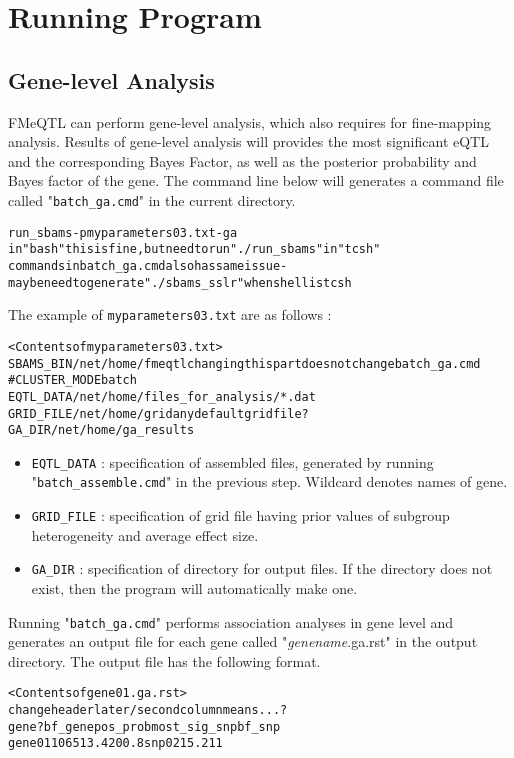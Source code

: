 \documentclass[11pt,fleqn]{article}
\begin{document}
\section{Running Program}
\subsection{Gene-level Analysis}
 FMeQTL can perform gene-level analysis, which also requires for fine-mapping analysis. Results of gene-level analysis will provides the most significant eQTL and the corresponding Bayes Factor, as well as the posterior probability and Bayes factor of the gene. 
 The command line below will generates a command file called "{\tt batch\_ga.cmd}" in the current directory.
 \begin{alltt}
 run_sbams -p myparameters03.txt -ga
 {\color{red} in "bash" this is fine, but need to run "./run_sbams" in "tcsh"}
 {\color{red} commands in batch_ga.cmd also has same issue - maybe need to generate "./sbams_sslr" when shell is tcsh}
 \end{alltt}
 The example of {\tt myparameters03.txt} are as follows :
  \begin{alltt}
 <Contents of  myparameters03.txt>
 SBAMS_BIN /net/home/fmeqtl {\color{red} changing this part does not change batch_ga.cmd}
 #CLUSTER_MODE batch
 EQTL_DATA /net/home/files_for_analysis/*.dat
 GRID_FILE /net/home/grid  {\color{red} any default grid file?}
 GA_DIR    /net/home/ga_results
 \end{alltt}
 \begin{itemize}
 	\item {\tt EQTL\_DATA} : specification of assembled files, generated by running "{\tt batch\_assemble.cmd}" in the previous step. Wildcard denotes names of gene.
 	\item {\tt GRID\_FILE} : specification of grid file having prior values of subgroup heterogeneity and average effect size.
 	\item {\tt GA\_DIR} : specification of directory for output files. If the directory does not exist, then the program will automatically make one. 
 \end{itemize}
 
 Running "{\tt batch\_ga.cmd}" performs association analyses in gene level and generates  an output file for each gene called "\textit{genename}.ga.rst" in the output directory. The output file has the following format.
   \begin{alltt}
   <Contents of  gene01.ga.rst>
   {\color{red} change header later / second column means...?}
   gene	?	bf_gene	pos_prob	most_sig_snp	bf_snp	
   gene01 1065	13.420	0.8	snp02	15.211	
   \end{alltt}
\end{document}
